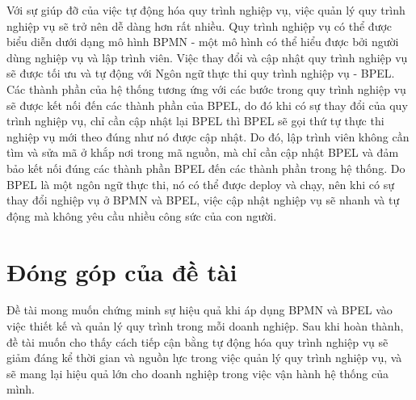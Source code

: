 Với sự giúp đỡ của việc tự động hóa quy trình nghiệp vụ, việc quản lý quy trình nghiệp vụ sẽ trở nên dễ dàng hơn rất nhiều. Quy trình nghiệp vụ có thể được biểu diễn dưới dạng mô hình BPMN - một mô hình có thể hiểu được bởi người dùng nghiệp vụ và lập trình viên. Việc thay đổi và cập nhật quy trình nghiệp vụ sẽ được tối ưu và tự động với Ngôn ngữ thực thi quy trình nghiệp vụ - BPEL. Các thành phần của hệ thống tương ứng với các bước trong quy trình nghiệp vụ sẽ được kết nối đến các thành phần của BPEL, do đó khi có sự thay đổi của quy trình nghiệp vụ, chỉ cần cập nhật lại BPEL thì BPEL sẽ gọi thứ tự thực thi nghiệp vụ mới theo đúng như nó được cập nhật. Do đó, lập trình viên không cần tìm và sửa mã ở khắp nơi trong mã nguồn, mà chỉ cần cập nhật BPEL và đảm bảo kết nối đúng các thành phần BPEL đến các thành phần trong hệ thống. Do BPEL là một ngôn ngữ thực thi, nó có thể được deploy và chạy, nên khi có sự thay đổi nghiệp vụ ở BPMN và BPEL, việc cập nhật nghiệp vụ sẽ nhanh và tự động mà không yêu cầu nhiều công sức của con người.

\section{Đóng góp của đề tài}
\hspace{0.5cm} Đề tài mong muốn chứng minh sự hiệu quả khi áp dụng BPMN và BPEL vào việc thiết kế và quản lý quy trình trong mỗi doanh nghiệp. Sau khi hoàn thành, đề tài muốn cho thấy cách tiếp cận bằng tự động hóa quy trình nghiệp vụ sẽ giảm đáng kể thời gian và nguồn lực trong việc quản lý quy trình nghiệp vụ, và sẽ mang lại hiệu quả lớn cho doanh nghiệp trong việc vận hành hệ thống của mình.

